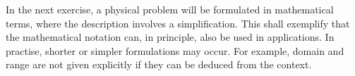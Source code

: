\begin{MExercises}
%
%
%
%

In the next exercise, a physical problem will be formulated in mathematical terms, 
where the description involves a simplification. This shall exemplify that 
the mathematical notation can, in principle, also be used in applications. 
In practise, shorter or simpler formulations may occur. For example, domain and range are not 
given explicitly if they can be deduced from the context.


\end{MExercises}
